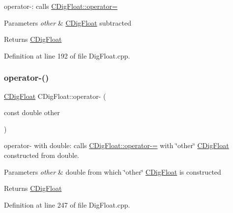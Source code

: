 operator-\/\+: calls \hyperlink{classCDigFloat_a74f36566c2c79d7258b7b2dee35d46b2}{C\+Dig\+Float\+::operator=} 


\begin{DoxyParams}{Parameters}
{\em other} & \hyperlink{classCDigFloat}{C\+Dig\+Float} subtracted \\
\hline
\end{DoxyParams}
\begin{DoxyReturn}{Returns}
\hyperlink{classCDigFloat}{C\+Dig\+Float} 
\end{DoxyReturn}


Definition at line 192 of file Dig\+Float.\+cpp.

\mbox{\label{classCDigFloat_ad873c5c22f0f18e89caf7309a043bfa0}} 
\subsubsection{\texorpdfstring{operator-\/()}{operator-()}\hspace{0.1cm}{\footnotesize\ttfamily [2/2]}}
{\footnotesize\ttfamily \hyperlink{classCDigFloat}{C\+Dig\+Float} C\+Dig\+Float\+::operator-\/ (\begin{DoxyParamCaption}\item[{const double}]{other }\end{DoxyParamCaption})}



operator-\/ with double\+: calls \hyperlink{classCDigFloat_a7496a4f8445815e9a346076c3d90305a}{C\+Dig\+Float\+::operator-\/=} with \char`\"{}other\char`\"{} \hyperlink{classCDigFloat}{C\+Dig\+Float} constructed from double. 


\begin{DoxyParams}{Parameters}
{\em other} & double from which \char`\"{}other\char`\"{} \hyperlink{classCDigFloat}{C\+Dig\+Float} is constructed \\
\hline
\end{DoxyParams}
\begin{DoxyReturn}{Returns}
\hyperlink{classCDigFloat}{C\+Dig\+Float} 
\end{DoxyReturn}


Definition at line 247 of file Dig\+Float.\+cpp.

\mbox{\label{classCDigFloat_a7496a4f8445815e9a346076c3d90305a}} 
